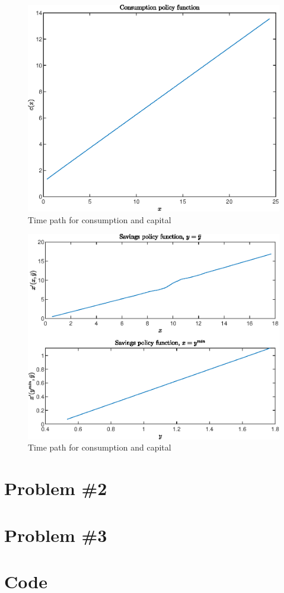 \documentclass[12pt]{article}
\newcommand{\1}{{\bf 1}} %
\begin{document}
	\begin{figure}[H]
		\centering
		\includegraphics[width=0.7\linewidth]{fig4}
		\caption{Time path for consumption and capital}
		\label{fig:fig4}
	\end{figure}

	\begin{figure}[H]
		\centering
		\includegraphics[width=0.7\linewidth]{fig5}
		\caption{Time path for consumption and capital}
		\label{fig:fig5}
	\end{figure}

\section*{Problem \#2}

\section*{Problem \#3}
	
\section*{Code}
\end{document}
